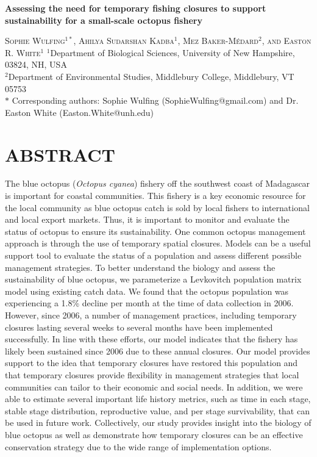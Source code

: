 \documentclass[
]{article}
\author{}
\date{\vspace{-2.5em}}
\begin{document}
\begin{center}
    
\textbf{\Large Assessing the need for temporary fishing closures to support sustainability for a small-scale octopus fishery}
    
\textsc{Sophie Wulfing$^{1*}$, Ahilya Sudarshan Kadba$^{1}$, Mez Baker-Médard$^{2}$, and Easton R. White$^{1}$}
\vspace{3 mm}
\normalsize{\indent $^1$Department of Biological Sciences, University of New Hampshire, 03824, NH, USA \\ $^2$Department of Environmental Studies, Middlebury College, Middlebury, VT 05753\\}
$\text{*}$ Corresponding authors: Sophie Wulfing (SophieWulfing@gmail.com) and Dr. Easton White (Easton.White@unh.edu)
\end{center}

\newpage

\linenumbers

\hypertarget{abstract}{%
\section{ABSTRACT}\label{abstract}}

The blue octopus (\emph{Octopus cyanea}) fishery off the southwest coast of Madagascar is important for coastal communities. This fishery is a key economic resource for the local community as blue octopus catch is sold by local fishers to international and local export markets. Thus, it is important to monitor and evaluate the status of octopus to ensure its sustainability. One common octopus management approach is through the use of temporary spatial closures. Models can be a useful support tool to evaluate the status of a population and assess different possible management strategies. To better understand the biology and assess the sustainability of blue octopus, we parameterize a Levkovitch population matrix model using existing catch data. We found that the octopus population was experiencing a 1.8\% decline per month at the time of data collection in 2006. However, since 2006, a number of management practices, including temporary closures lasting several weeks to several months have been implemented successfully. In line with these efforts, our model indicates that the fishery has likely been sustained since 2006 due to these annual closures. Our model provides support to the idea that temporary closures have restored this population and that temporary closures provide flexibility in management strategies that local communities can tailor to their economic and social needs. In addition, we were able to estimate several important life history metrics, such as time in each stage, stable stage distribution, reproductive value, and per stage survivability, that can be used in future work. Collectively, our study provides insight into the biology of blue octopus as well as demonstrate how temporary closures can be an effective conservation strategy due to the wide range of implementation options.
\end{document}
